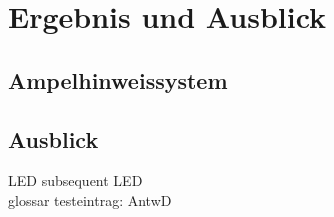 \chapter{Ergebnis und Ausblick}
\section{Ampelhinweissystem}
\section{Ausblick}
\gls{LED} subsequent \gls{LED}\\
glossar testeintrag: \gls{AntwD}
